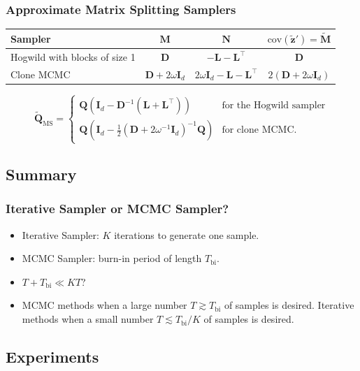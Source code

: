 \documentclass[aspectratio=169]{beamer}
\newcommand{\B}[1]{\mathbf{#1}} %
\newcommand{\pr}[1]{\left(#1\right)} %
\begin{document}
\begin{frame}
\frametitle{Approximate Matrix Splitting Samplers}
\begin{table}
{
\begin{center}
{\renewcommand{\arraystretch}{1.5}
\begin{tabular}{|l|c|c|c|} 
  \hline
  \textbf{Sampler} & $\B{M}$ & $\B{N}$ & $\mathrm{cov}(\tilde{\B{z}}') = \tilde{\B{M}}$ \\
  \hline 
  Hogwild with blocks of size 1 & $\B{D}$ & $-\B{L} - \B{L}^{\top}$ & $\B{D}$ \\ 
  Clone MCMC & $\B{D} + 2\omega\B{I}_d$ & $2\omega\B{I}_d -\B{L} - \B{L}^{\top}$ & $2\pr{\B{D}+ 2\omega\B{I}_d}$\\[0.3em]
  \hline
\end{tabular}}
\end{center}
}
\end{table}
\[
\widetilde{\B{Q}}_{\mathrm{MS}} =
\begin{cases}
\B{Q}\pr{\B{I}_d - \B{D}^{-1}(\B{L}+\B{L}^{\top})} & \text{for the Hogwild sampler}\\
\B{Q}\pr{\B{I}_d - \frac{1}{2}(\B{D} + 2\omega^{-1}\B{I}_d)^{-1}\B{Q}} & \text{for clone MCMC.}
\end{cases}    \]
\end{frame}

\subsection{Summary}
\begin{frame}
\frametitle{Iterative Sampler or MCMC Sampler?}
\begin{itemize}
\item Iterative Sampler: $K$ iterations to generate one sample. 
\item MCMC Sampler: burn-in period of length $T_{\text{bi}}$.
\item $T + T_{\text{bi}} \ll KT$?
\item MCMC methods when a large number $T\gtrsim T_{\text{bi}}$ of samples is desired. Iterative methods when a small number $T\lesssim T_{\text{bi}}/K$ of samples is desired.
\end{itemize}
\end{frame}

\subsection{Experiments}
\begin{frame}
\end{frame}
\end{document}
